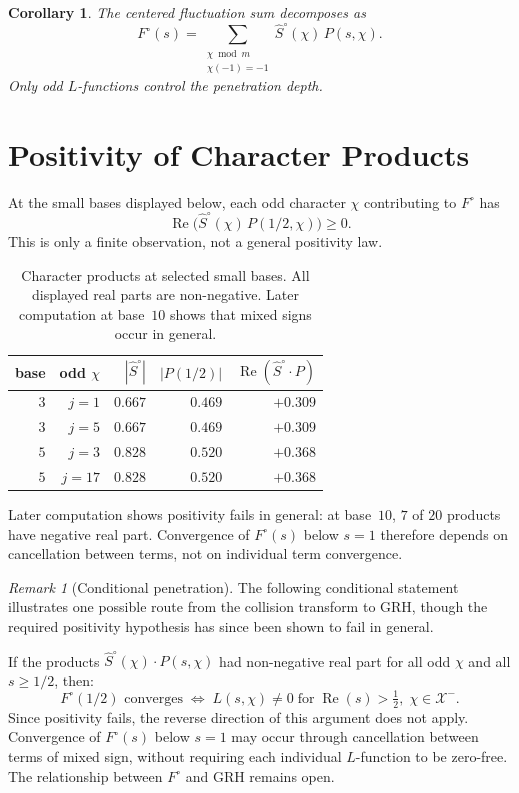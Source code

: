 \documentclass[12pt]{amsart}
\newtheorem{corollary}[theorem]{Corollary}
\theoremstyle{definition}
\theoremstyle{remark}
\newtheorem{remark}[theorem]{Remark}
\begin{document}
\begin{corollary}
The centered fluctuation sum decomposes as
\[
F^{\circ}(s) = \sum_{\substack{\chi \bmod m \\
\chi(-1) = -1}} \hat{S}^{\circ}(\chi)\, P(s, \chi).
\]
Only odd $L$-functions control the penetration depth.
\end{corollary}

\section{Positivity of Character Products}

At the small bases displayed below, each odd character
$\chi$ contributing to $F^{\circ}$ has
\[
\operatorname{Re}\bigl(\hat{S}^{\circ}(\chi)\, P(1/2, \chi)\bigr)\ge 0.
\]
This is only a finite observation, not a general positivity
law.

\begin{table}[h]
\centering
\begin{tabular}{rrrrr}
\toprule
base & odd $\chi$ & $|\hat{S}^{\circ}|$ & $|P(1/2)|$
& $\operatorname{Re}(\hat{S}^{\circ} \cdot P)$ \\
\midrule
$3$ & $j = 1$ & $0.667$ & $0.469$ & $+0.309$ \\
$3$ & $j = 5$ & $0.667$ & $0.469$ & $+0.309$ \\
$5$ & $j = 3$ & $0.828$ & $0.520$ & $+0.368$ \\
$5$ & $j = 17$ & $0.828$ & $0.520$ & $+0.368$ \\
\bottomrule
\end{tabular}
\caption{Character products at selected small bases.
All displayed real parts are non-negative. Later
computation at base~$10$ shows that mixed signs occur
in general.}
\label{tab:positivity}
\end{table}

Later computation shows positivity fails in general:
at base~$10$, $7$ of $20$ products have negative real
part. Convergence of $F^{\circ}(s)$ below $s = 1$
therefore depends on cancellation between terms, not
on individual term convergence.

\begin{remark}[Conditional penetration]
The following conditional statement illustrates one
possible route from the collision transform to GRH,
though the required positivity hypothesis has since
been shown to fail in general.

If the products
$\hat{S}^{\circ}(\chi) \cdot P(s, \chi)$ had
non-negative real part for all odd $\chi$ and all
$s \ge 1/2$, then:
\[
F^{\circ}(1/2) \text{ converges}
\;\Longleftrightarrow\;
L(s, \chi) \ne 0 \;\text{for}\;
\operatorname{Re}(s) > \tfrac{1}{2},\;
\chi \in \mathcal{X}^{-}.
\]
Since positivity fails, the reverse direction of this
argument does not apply. Convergence of $F^{\circ}(s)$
below $s = 1$ may occur through cancellation between
terms of mixed sign, without requiring each individual
$L$-function to be zero-free. The relationship between
$F^{\circ}$ and GRH remains open.
\end{remark}
\end{document}
